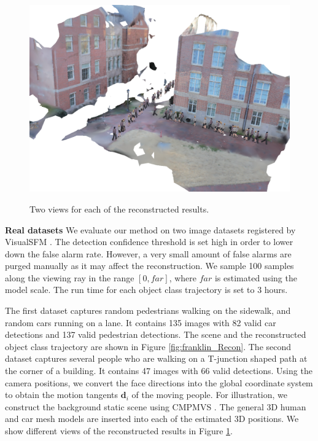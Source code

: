 \begin{figure}
{    \includegraphics[height=0.21\textheight]{chapter4/resource/tjunction2.PNG}
}
\caption[Example reconstruction results on two real datasets.]{Two views for each of the reconstructed results.}
\label{fig:reconstructed}
\end{figure}
\textbf{Real datasets} We evaluate our method on two image datasets  registered by VisualSFM \cite{WuVSFM}. The detection confidence threshold  is set high in order to lower down the false alarm rate. However, a very small amount of false alarms are purged manually as it may affect the reconstruction.  We sample 100 samples along the viewing ray in the range $[0,far]$, where $far$ is  estimated using the model scale. The run time for each object class trajectory is set to 3 hours.

The first dataset captures random pedestrians walking on the sidewalk, and random cars running on a lane. It contains 135 images with 82 valid car detections and 137 valid pedestrian detections. The scene and the reconstructed object class trajectory are shown in Figure \ref{fig:franklin_Recon}. %
The second dataset captures several people who are walking on a T-junction shaped path at the corner of a building. It contains 47 images with 66 valid detections. Using the camera positions, we convert the face directions into the global coordinate system to obtain the motion tangents $\mathbf d_i$ of the moving people. For illustration, we construct the background static scene using CMPMVS \cite{JAN}. The general 3D human and car mesh models are inserted into each of the estimated 3D positions. We show different views of the reconstructed results in Figure \ref{fig:reconstructed}.

